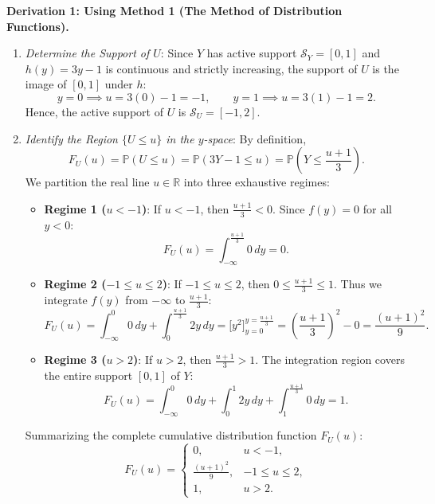 \documentclass[11pt, letterpaper]{article}
\theoremstyle{definition}
\theoremstyle{remark}
\newcommand{\R}{\mathbb{R}}
\newcommand{\Prob}{\mathbb{P}}
\begin{document}
\textbf{Derivation 1: Using Method 1 (The Method of Distribution Functions).}
\begin{enumerate}[label=\textbf{Step \arabic*:}]
    \item \textit{Determine the Support of $U$}: Since $Y$ has active support $\mathcal{S}_Y = [0, 1]$ and $h(y) = 3y - 1$ is continuous and strictly increasing, the support of $U$ is the image of $[0, 1]$ under $h$:
    \[
        y = 0 \implies u = 3(0) - 1 = -1, \qquad y = 1 \implies u = 3(1) - 1 = 2.
    \]
    Hence, the active support of $U$ is $\mathcal{S}_U = [-1, 2]$.
    
    \item \textit{Identify the Region $\{U \le u\}$ in the $y$-space}: By definition,
    \[
        F_U(u) = \Prob(U \le u) = \Prob(3Y - 1 \le u) = \Prob\left(Y \le \frac{u + 1}{3}\right).
    \]
    We partition the real line $u \in \R$ into three exhaustive regimes:
    \begin{itemize}
        \item \textbf{Regime 1 ($u < -1$)}: If $u < -1$, then $\frac{u+1}{3} < 0$. Since $f(y) = 0$ for all $y < 0$:
        \[
            F_U(u) = \int_{-\infty}^{\frac{u+1}{3}} 0 \, dy = 0.
        \]
        \item \textbf{Regime 2 ($-1 \le u \le 2$)}: If $-1 \le u \le 2$, then $0 \le \frac{u+1}{3} \le 1$. Thus we integrate $f(y)$ from $-\infty$ to $\frac{u+1}{3}$:
        \[
            F_U(u) = \int_{-\infty}^0 0 \, dy + \int_0^{\frac{u+1}{3}} 2y \, dy = \Big[y^2\Big]_{y=0}^{y=\frac{u+1}{3}} = \left(\frac{u + 1}{3}\right)^2 - 0 = \frac{(u + 1)^2}{9}.
        \]
        \item \textbf{Regime 3 ($u > 2$)}: If $u > 2$, then $\frac{u+1}{3} > 1$. The integration region covers the entire support $[0, 1]$ of $Y$:
        \[
            F_U(u) = \int_{-\infty}^0 0 \, dy + \int_0^1 2y \, dy + \int_1^{\frac{u+1}{3}} 0 \, dy = 1.
        \]
    \end{itemize}
    Summarizing the complete cumulative distribution function $F_U(u)$:
    \[
        F_U(u) = \begin{cases}
            0, & u < -1, \\[4pt]
            \displaystyle \frac{(u + 1)^2}{9}, & -1 \le u \le 2, \\[8pt]
            1, & u > 2.
        \end{cases}
    \]
    

\end{enumerate}
\end{document}
